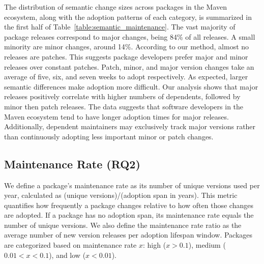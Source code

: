 \documentclass[conference]{IEEEtran}
\begin{document}
The distribution of semantic change sizes across packages in the Maven ecosystem, along with the adoption patterns of each category, is summarized in the first half of Table~\ref{table:semantic_maintenance}.
The vast majority of package releases correspond to major changes, being 84\% of all releases. A small minority are minor changes, around 14\%. According to our method, almost no releases are patches. This suggests package developers prefer major and minor releases over constant patches.
Patch, minor, and major version changes take an average of five, six, and seven weeks to adopt respectively. As expected, larger semantic differences make adoption more difficult.
Our analysis shows that major releases positively correlate with higher numbers of dependents, followed by minor then patch releases. The data suggests that software developers in the Maven ecosystem tend to have longer adoption times for major releases. Additionally, dependent maintainers may exclusively track major versions rather than continuously adopting less important minor or patch changes. 

\subsection{Maintenance Rate (RQ2)} \label{sec: maint}
We define a package’s maintenance rate as its number of unique versions used per year, calculated as (unique versions)/(adoption span in years). This metric quantifies how frequently a package changes relative to how often those changes are adopted. If a package has no adoption span, its maintenance rate equals the number of unique versions. We also define the maintenance rate ratio as the average number of new version releases per adoption lifespan window. Packages are categorized based on maintenance rate $x$: high ($x > 0.1$), medium ($0.01 < x < 0.1$), and low ($x < 0.01$).
\end{document}
